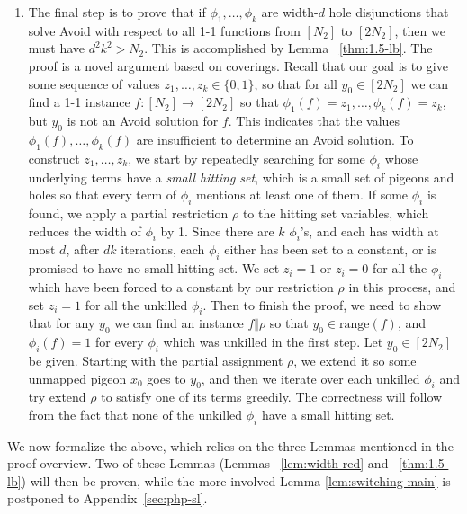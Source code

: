 \documentclass[11pt]{article}
\newcommand{\B}{\{0,1\}}
\newcommand{\rng}{\mathrm{range}}
\begin{document}
\begin{enumerate}
 \item The final step is to prove that if $\phi_1,\ldots,\phi_k$ are width-$d$ hole disjunctions that solve Avoid with respect to all 1-1 functions from $[N_2]$ to $[2N_2]$, then we must have $d^2k^2 > N_2$.
 This is accomplished by Lemma ~\ref{thm:1.5-lb}. The proof is a novel argument based on coverings. Recall that our goal is to give some sequence of values $z_1, \ldots, z_k \in \B$, so that for all $y_0 \in [2N_2]$ we can find a 1-1 instance $f: [N_2] \to [2N_2]$ so that $\phi_1(f)=z_1, \ldots,\phi_k(f)=z_k$, but $y_0$ is not an Avoid solution for $f$. This indicates that the values $\phi_1(f), \ldots,\phi_k(f)$ are insufficient to determine an Avoid solution. To construct $z_1,\ldots,z_k$, we start by repeatedly searching for some $\phi_i$ whose underlying terms have a \emph{small hitting set}, which is a small set of pigeons and holes so that every term of $\phi_i$ mentions at least one of them. If some $\phi_i$ is found, we apply a partial restriction $\rho$ to the hitting set variables, which reduces the width of $\phi_i$ by 1.
 Since there are $k$ $\phi_i$'s, and each has width at most $d$, after $dk$ iterations, each $\phi_i$ either has been set to a constant, or is promised to have no small hitting set. We set $z_i = 1$ or $z_i = 0$ for all the $\phi_i$ which have been forced to a constant by our restriction $\rho$ in this process, and set $z_i=1$ for all the unkilled $\phi_i$. Then to finish the proof, we need to show that for any $y_0$ we can find an instance $f \Vert \rho$ so that $y_0 \in \rng(f)$, and $\phi_i(f)=1$ for every $\phi_i$ which was unkilled in the first step. Let $y_0 \in [2N_2]$ be given. Starting with the partial assignment $\rho$, we extend it so some unmapped pigeon $x_0$ goes to $y_0$, and then we iterate over each unkilled $\phi_i$ and try extend $\rho$ to satisfy one of its terms greedily. The correctness will follow from the fact that none of the unkilled $\phi_i$ have a small hitting set.
 \end{enumerate}
 
 We now formalize the above, which relies on the three Lemmas mentioned in the proof overview. 
 Two of these Lemmas (Lemmas ~\ref{lem:width-red} and ~\ref{thm:1.5-lb}) will then be proven, while the more involved Lemma \ref{lem:switching-main} is postponed to Appendix~\ref{sec:php-sl}. 
 
\end{document}
